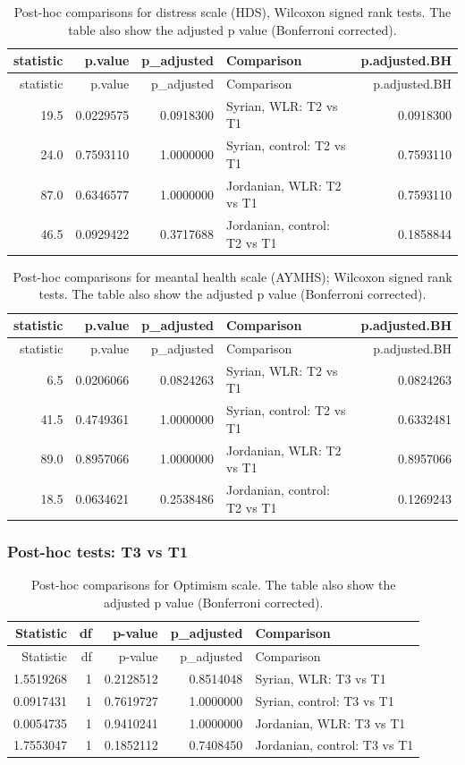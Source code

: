 \documentclass[]{article}
\begin{document}
\begin{longtable}[]{@{}rrrlr@{}}
\caption{Post-hoc comparisons for distress scale (HDS), Wilcoxon signed
rank tests. The table also show the adjusted p value (Bonferroni
corrected).}\tabularnewline
\toprule
statistic & p.value & p\_adjusted & Comparison &
p.adjusted.BH\tabularnewline
\midrule
\endfirsthead
\toprule
statistic & p.value & p\_adjusted & Comparison &
p.adjusted.BH\tabularnewline
\midrule
\endhead
19.5 & 0.0229575 & 0.0918300 & Syrian, WLR: T2 vs T1 &
0.0918300\tabularnewline
24.0 & 0.7593110 & 1.0000000 & Syrian, control: T2 vs T1 &
0.7593110\tabularnewline
87.0 & 0.6346577 & 1.0000000 & Jordanian, WLR: T2 vs T1 &
0.7593110\tabularnewline
46.5 & 0.0929422 & 0.3717688 & Jordanian, control: T2 vs T1 &
0.1858844\tabularnewline
\bottomrule
\end{longtable}

\begin{longtable}[]{@{}rrrlr@{}}
\caption{Post-hoc comparisons for meantal health scale (AYMHS); Wilcoxon
signed rank tests. The table also show the adjusted p value (Bonferroni
corrected).}\tabularnewline
\toprule
statistic & p.value & p\_adjusted & Comparison &
p.adjusted.BH\tabularnewline
\midrule
\endfirsthead
\toprule
statistic & p.value & p\_adjusted & Comparison &
p.adjusted.BH\tabularnewline
\midrule
\endhead
6.5 & 0.0206066 & 0.0824263 & Syrian, WLR: T2 vs T1 &
0.0824263\tabularnewline
41.5 & 0.4749361 & 1.0000000 & Syrian, control: T2 vs T1 &
0.6332481\tabularnewline
89.0 & 0.8957066 & 1.0000000 & Jordanian, WLR: T2 vs T1 &
0.8957066\tabularnewline
18.5 & 0.0634621 & 0.2538486 & Jordanian, control: T2 vs T1 &
0.1269243\tabularnewline
\bottomrule
\end{longtable}

\newpage

\hypertarget{post-hoc-tests-t3-vs-t1}{%
\subsubsection{Post-hoc tests: T3 vs T1}\label{post-hoc-tests-t3-vs-t1}}

\begin{longtable}[]{@{}rrrrl@{}}
\caption{Post-hoc comparisons for Optimism scale. The table also show
the adjusted p value (Bonferroni corrected).}\tabularnewline
\toprule
Statistic & df & p-value & p\_adjusted & Comparison\tabularnewline
\midrule
\endfirsthead
\toprule
Statistic & df & p-value & p\_adjusted & Comparison\tabularnewline
\midrule
\endhead
1.5519268 & 1 & 0.2128512 & 0.8514048 & Syrian, WLR: T3 vs
T1\tabularnewline
0.0917431 & 1 & 0.7619727 & 1.0000000 & Syrian, control: T3 vs
T1\tabularnewline
0.0054735 & 1 & 0.9410241 & 1.0000000 & Jordanian, WLR: T3 vs
T1\tabularnewline
1.7553047 & 1 & 0.1852112 & 0.7408450 & Jordanian, control: T3 vs
T1\tabularnewline
\bottomrule
\end{longtable}
\end{document}
